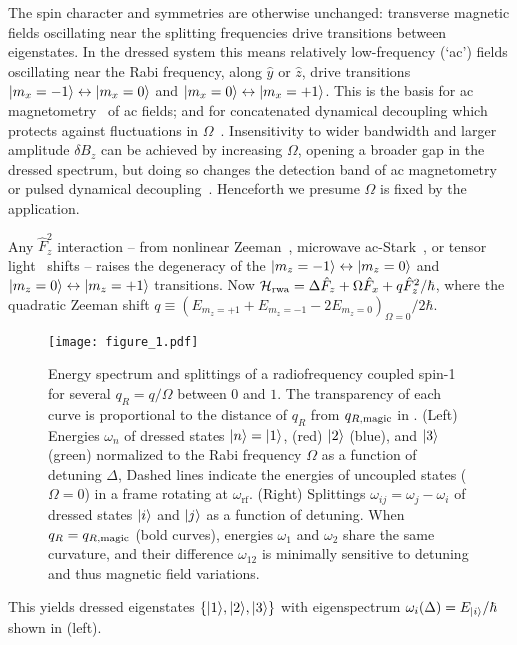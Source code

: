 \documentclass[aps,prl,reprint,superscriptaddress,floatfix]{revtex4-1}
\begin{document}
The spin character and symmetries are otherwise unchanged: transverse magnetic fields oscillating near the splitting frequencies drive transitions between eigenstates.
In the dressed system this means relatively low-frequency (`ac') fields oscillating near the Rabi frequency, along $\hat{y}$ or $\hat{z}$, drive transitions $\vert m_x=-1 \rangle  \leftrightarrow \vert m_x=0 \rangle $ and $\vert m_x=0 \rangle  \leftrightarrow \vert m_x=+1 \rangle $.
This is the basis for ac magnetometry~\cite{hirose_continuous_2012} of ac fields; and for concatenated dynamical decoupling  which protects against fluctuations in $\Omega$~\cite{cai_robust_2012}.
Insensitivity to wider bandwidth and larger amplitude $\delta B_z$ can be achieved by increasing $\Omega$, opening a broader gap in the dressed spectrum, but doing so changes the detection band of ac magnetometry~\cite{loretz_radio-frequency_2013} or pulsed dynamical decoupling~\cite{boss_quantum_2017,*schmitt_submillihertz_2017}.
Henceforth we presume $\Omega$ is fixed by the application.

Any $\hat{F}_z^2$ interaction -- from nonlinear Zeeman~\cite{ramsey_molecular_1956}, microwave ac-Stark~\cite{gerbier_resonant_2006}, or tensor light~\cite{smith_continuous_2004} shifts -- raises the degeneracy of the $\vert m_z=-1 \rangle  \leftrightarrow \vert m_z=0 \rangle $ and $\vert m_z=0 \rangle  \leftrightarrow \vert m_z=+1 \rangle $ transitions. 
Now $\mathcal{H}_{\text{rwa}} = \Delta \hat{F}_z + \Omega \hat{F}_x + q \hat{F}_z^2/\hbar$, where the quadratic Zeeman shift $q \equiv (E_{m_z=+1} + E_{m_z=-1} - 2 E_{m_z=0})_{\Omega=0}/2\hbar$.
\begin{figure}
    \texttt{[image: figure\_1.pdf]}
    \caption{
    \label{fig:eigensystem_schematic}
        Energy spectrum and splittings of a radiofrequency coupled spin-1 for several $q_R = q/\Omega$ between $0$ and $1$.
        The transparency of each curve is proportional to the distance of $q_R$ from $q_{R,\text{magic}}$ in .
        (Left) Energies $\omega_n$ of dressed states $\vert n \rangle =\vert 1 \rangle $, (red) $\vert 2 \rangle $ (blue), and $\vert 3 \rangle $ (green) normalized to the Rabi frequency $\Omega$ as a function of detuning $\Delta$,
        Dashed lines indicate the energies of uncoupled states ($\Omega=0$) in a frame rotating at $\omega_{\text{rf}}$.
        (Right) Splittings $\omega_{ij} = \omega_j - \omega_i$ of dressed states $\vert i \rangle $ and $\vert j \rangle $ as a function of detuning.
        When $q_R=q_{R,\text{magic}}$ (bold curves), energies $\omega_1$ and $\omega_2$ share the same curvature, and their difference $\omega_{12}$ is minimally sensitive to detuning and thus magnetic field variations.
    }
\end{figure}
This yields dressed eigenstates $\{\vert 1 \rangle , \vert 2 \rangle , \vert 3 \rangle \}$ with eigenspectrum $\omega_i(\Delta) = E_{\vert i \rangle }/\hbar$ shown in  (left).
\end{document}
